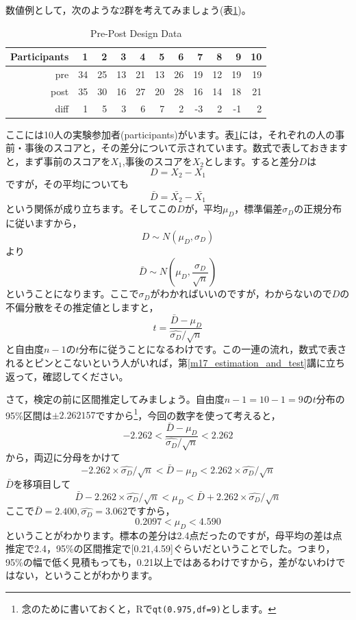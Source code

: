 \documentclass{ltjsbook}
\begin{document}
数値例として，次のような2群を考えてみましょう(表\ref{tbl19::01})。
\begin{table}[ht]
	\centering
	\caption{Pre-Post Design Data}
	\begin{tabular}{rrrrrrrrrrr}
		\hline
		Participants & 1  & 2  & 3  & 4  & 5  & 6  & 7  & 8  & 9  & 10 \\
		\hline
		pre          & 34 & 25 & 13 & 21 & 13 & 26 & 19 & 12 & 19 & 19 \\
		post         & 35 & 30 & 16 & 27 & 20 & 28 & 16 & 14 & 18 & 21 \\ \hline
		diff         & 1  & 5  & 3  & 6  & 7  & 2  & -3 & 2  & -1 & 2  \\
		\hline
	\end{tabular}
	\label{tbl19::01}
\end{table}
ここには10人の実験参加者(participants)がいます。表\ref{tbl19::01}には，それぞれの人の事前・事後のスコアと，その差分について示されています。数式で表しておきますと，まず事前のスコアを$X_1$,事後のスコアを$X_2$とします。すると差分$D$は
\[ D = X_2 - X_1 \]
ですが，その平均についても
\[ \bar{D} = \bar{X_2} - \bar{X_1} \]
という関係が成り立ちます。そしてこの$D$が，平均$\mu_D$，標準偏差$\sigma_D$の正規分布に従いますから，
\[ D \sim N(\mu_D,\sigma_D)\]
より
\[ \bar{D} \sim N(\mu_D,\frac{\sigma_D}{\sqrt{n}}) \]
ということになります。ここで$\sigma_D$がわかればいいのですが，わからないので$D$の不偏分散をその推定値としますと，
\[ t = \frac{\bar{D}-\mu_D}{\hat{\sigma_D}/\sqrt{n}} \]
と自由度$n-1$の$t$分布に従うことになるわけです。この一連の流れ，数式で表されるとピンとこないという人がいれば，第\ref{m17_estimation_and_test}講に立ち返って，確認してください。

さて，検定の前に区間推定してみましょう。自由度$n-1=10-1=9$の$t$分布の95\%区間は$\pm 2.262157$ですから\footnote{念のために書いておくと，Rで\texttt{qt(0.975,df=9)}とします。}，今回の数字を使って考えると，
\[ -2.262 < \frac{\bar{D}-\mu_D}{\hat{\sigma_D}/\sqrt{n}} < 2.262 \]
から，両辺に分母をかけて
\[ -2.262 \times \hat{\sigma_D}/\sqrt{n} < \bar{D}-\mu_D < 2.262 \times \hat{\sigma_D}/\sqrt{n} \]
$\bar{D}$を移項目して
\[ \bar{D}-2.262 \times \hat{\sigma_D}/\sqrt{n} < \mu_D < \bar{D}+2.262\times \hat{\sigma_D}/\sqrt{n} \]
ここで$\bar{D} = 2.400,\hat{\sigma_D} = 3.062$ですから，
\[ 0.2097 < \mu_D < 4.590 \]
ということがわかります。標本の差分は2.4点だったのですが，母平均の差は点推定で2.4，95\%の区間推定で[0.21,4.59]ぐらいだということでした。つまり，95\%の幅で低く見積もっても，0.21以上ではあるわけですから，差がないわけではない，ということがわかります。
\end{document}
